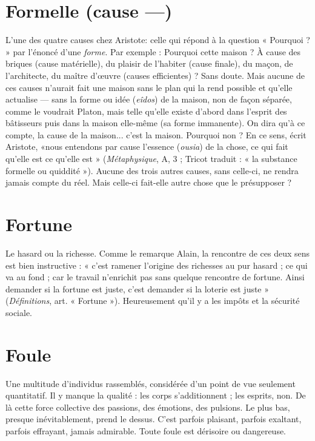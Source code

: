 \section{Formelle (cause —)}
L’une des quatre causes chez Aristote: celle qui
répond à la question « Pourquoi ? » par l’énoncé
d’une {\it forme}. Par exemple : Pourquoi cette maison ? À cause des briques (cause
matérielle), du plaisir de l’habiter (cause finale), du maçon, de l’architecte, du
maître d'œuvre (causes efficientes) ? Sans doute. Mais aucune de ces causes
n'aurait fait une maison sans le plan qui la rend possible et qu’elle actualise —
sans la forme ou idée ({\it eîdos}) de la maison, non de façon séparée, comme le voudrait
Platon, mais telle qu’elle existe d’abord dans l'esprit des bâtisseurs puis
dans la maison elle-même (sa forme immanente). On dira qu’à ce compte, la
cause de la maison... c’est la maison. Pourquoi non ? En ce sens, écrit Aristote,
«nous entendons par cause l’essence ({\it ousia}) de la chose, ce qui fait qu’elle est
ce qu'elle est » ({\it Métaphysique}, A, 3 ; Tricot traduit : « la substance formelle ou
quiddité »). Aucune des trois autres causes, sans celle-ci, ne rendra jamais
compte du réel. Mais celle-ci fait-elle autre chose que le présupposer ?

\section{Fortune}
Le hasard ou la richesse. Comme le remarque Alain, la rencontre
de ces deux sens est bien instructive : « c’est ramener
l’origine des richesses au pur hasard ; ce qui va au fond ; car le travail n’enrichit
pas sans quelque rencontre de fortune. Ainsi demander si la fortune est juste,
c'est demander si la loterie est juste » ({\it Définitions}, art. « Fortune »). Heureusement
qu'il y a les impôts et la sécurité sociale.

\section{Foule}
Une multitude d’individus rassemblés, considérée d’un point de
vue seulement quantitatif. Il y manque la qualité : les corps
s’additionnent ; les esprits, non. De là cette force collective des passions, des
émotions, des pulsions. Le plus bas, presque inévitablement, prend le dessus.
C’est parfois plaisant, parfois exaltant, parfois effrayant, jamais admirable.
Toute foule est dérisoire ou dangereuse.


